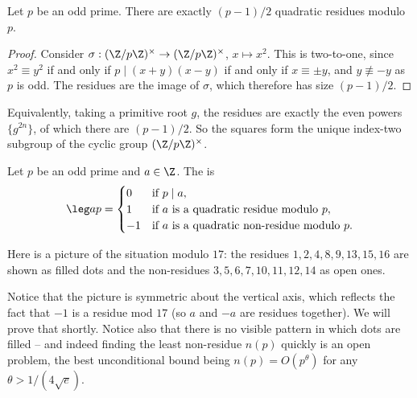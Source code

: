 \begin{lemma}\label{lem:halfqr}
	Let $p$ be an odd prime. There are exactly $(p-1)/2$ quadratic residues modulo $p$.
\end{lemma}
\begin{proof}
	Consider $\sigma : (\Z/p\Z)^\times \to (\Z/p\Z)^\times$, $x \mapsto x^2$. This is two-to-one, since $x^2 \equiv y^2$ if and only if $p \mid (x+y)(x-y)$ if and only if $x \equiv \pm y$, and $y \not\equiv -y$ as $p$ is odd. The residues are the image of $\sigma$, which therefore has size $(p-1)/2$.
\end{proof}

\begin{remark}
	Equivalently, taking a primitive root $g$, the residues are exactly the even powers $\{g^{2n}\}$, of which there are $(p-1)/2$. So the squares form the unique index-two subgroup of the cyclic group $(\Z/p\Z)^\times$.
\end{remark}

\begin{definition}
	Let $p$ be an odd prime and $a \in \Z$. The  is
	$$
	\leg ap = \begin{cases}
		0 & \text{if } p \mid a, \\
		1 & \text{if } a \text{ is a quadratic residue modulo } p, \\
		-1 & \text{if } a \text{ is a quadratic non-residue modulo } p.
	\end{cases}
	$$
\end{definition}

Here is a picture of the situation modulo $17$: the residues $1, 2, 4, 8, 9, 13, 15, 16$ are shown as filled dots and the non-residues $3, 5, 6, 7, 10, 11, 12, 14$ as open ones.

\begin{center}
\end{center}

Notice that the picture is symmetric about the vertical axis, which reflects the fact that $-1$ is a residue mod $17$ (so $a$ and $-a$ are residues together). We will prove that shortly. Notice also that there is no visible pattern in which dots are filled -- and indeed finding the least non-residue $n(p)$ quickly is an open problem, the best unconditional bound being $n(p) = O(p^\theta)$ for any $\theta > 1/(4\sqrt e)$.


